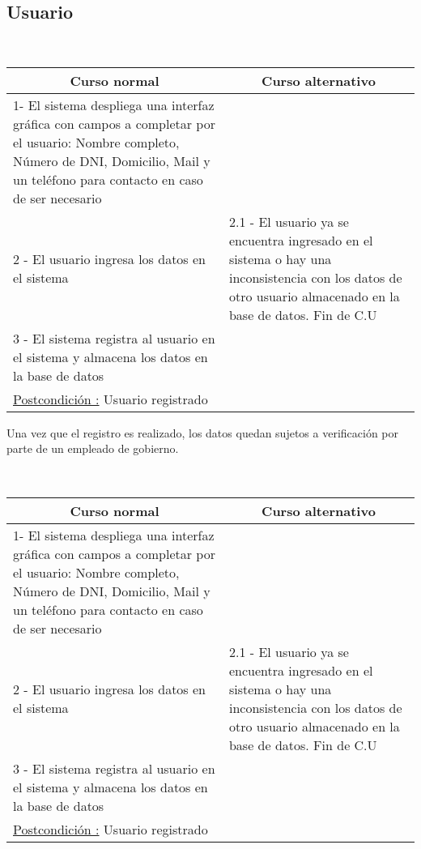 \subsection{Usuario}

~

\begin{center}
    \centering
    \begin{tabular}{ | p{11cm} | p{6cm} | }
    	\multicolumn{1}{c}{\cellcolor{black!30}\textbf{Curso normal}} & 
    	\multicolumn{1}{c}{\cellcolor{black!30}\textbf{Curso alternativo}} \\
		\hline
		1- El sistema despliega una interfaz gráfica con campos a completar
		por el usuario: Nombre completo, Número de DNI, Domicilio, Mail y un teléfono
		para contacto en caso de ser necesario &  \\ \hline
		2 - El usuario ingresa los datos en el sistema & 2.1 - El usuario ya se encuentra ingresado en el sistema
		o hay una inconsistencia con los datos de otro usuario almacenado en la base de datos. Fin de C.U \\ \hline
		3 - El sistema registra al usuario en el sistema y almacena los datos en la base de datos & \\ \hline
		\underline{Postcondición :} Usuario registrado & \\ \hline
    \end{tabular}
\end{center}

Una vez que el registro es realizado, los datos quedan sujetos a verificación por parte de un empleado de gobierno.

~

\begin{center}
    \centering
    \begin{tabular}{ | p{11cm} | p{6cm} | }
    	\multicolumn{1}{c}{\cellcolor{black!30}\textbf{Curso normal}} & 
    	\multicolumn{1}{c}{\cellcolor{black!30}\textbf{Curso alternativo}} \\
		\hline
		1- El sistema despliega una interfaz gráfica con campos a completar
		por el usuario: Nombre completo, Número de DNI, Domicilio, Mail y un teléfono
		para contacto en caso de ser necesario &  \\ \hline
		2 - El usuario ingresa los datos en el sistema & 2.1 - El usuario ya se encuentra ingresado en el sistema
		o hay una inconsistencia con los datos de otro usuario almacenado en la base de datos. Fin de C.U \\ \hline
		3 - El sistema registra al usuario en el sistema y almacena los datos en la base de datos & \\ \hline
		\underline{Postcondición :} Usuario registrado & \\ \hline
    \end{tabular}
\end{center}

